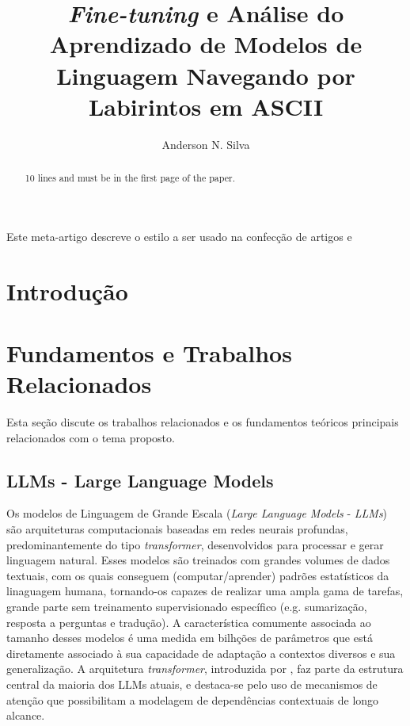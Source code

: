 \documentclass[12pt]{article}
\title{\textit{Fine-tuning} e Análise do Aprendizado de Modelos de Linguagem Navegando por Labirintos em ASCII}
\author{Anderson N. Silva\inst{1}}
\begin{document}
 

\maketitle

\begin{abstract}
  10 lines and must be in the first page of the paper.
\end{abstract}
     
\begin{resumo} 
  Este meta-artigo descreve o estilo a ser usado na confecção de artigos e
\end{resumo}


\section{Introdução}



\section{Fundamentos e Trabalhos Relacionados}

Esta seção discute os trabalhos relacionados e os fundamentos teóricos principais relacionados com o tema proposto.

\subsection{LLMs - Large Language Models}

Os modelos de Linguagem de Grande Escala (\textit{Large Language Models} - \textit{LLMs}) são arquiteturas computacionais baseadas em redes neurais profundas, predominantemente do tipo \textit{transformer}, desenvolvidos para processar e gerar linguagem natural. Esses modelos são treinados com grandes volumes de dados textuais, com os quais conseguem (computar/aprender) padrões estatísticos da linaguagem humana, tornando-os capazes de realizar uma ampla gama de tarefas, grande parte sem treinamento supervisionado específico (e.g. sumarização, resposta a perguntas e tradução). A característica comumente associada ao tamanho desses modelos é uma medida em bilhções de parâmetros que está diretamente associado à sua capacidade de adaptação a contextos diversos e sua generalização. A arquitetura \textit{transformer}, introduzida por \cite{vaswani2023attentionneed}, faz parte da estrutura central da maioria dos LLMs atuais, e destaca-se pelo uso de mecanismos de atenção que possibilitam a modelagem de dependências contextuais de longo alcance. 
\end{document}

